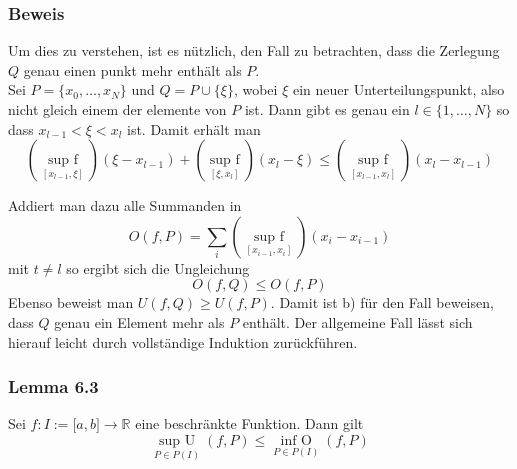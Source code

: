 \subsubsection*{Beweis} 
Um dies zu verstehen, ist es nützlich, den Fall zu betrachten, dass die Zerlegung $Q$ genau einen punkt mehr enthält als $P$.\\

Sei $P=\{x_0,\dots ,x_N\}$ und $Q=P\cup \{\xi\}$, wobei $\xi$ ein neuer Unterteilungspunkt, also nicht gleich einem der elemente von $P$ ist. Dann gibt es genau ein $l\in \{ 1,\dots,N\}$ so dass $x_{l-1}<\xi <x_l$ ist. Damit erhält man $$(\mathop {\sup {\text{ }}f}\limits_{[{x_{l - 1}},\xi ]} )(\xi  - {x_{l - 1}}) + (\mathop {\sup {\text{ }}f}\limits_{[\xi ,{x_l}]} )({x_l} - \xi ) \le (\mathop {\sup {\text{ }}f}\limits_{[{x_{l - 1}},{x_l}]} )({x_l} - {x_{l - 1}})$$


\begin{center}
\end{center}


Addiert man dazu alle Summanden in $$O(f,P)=\sum\limits_i {(\mathop {\sup {\text{ }}f}\limits_{[{x_{i - 1}},{x_i}]} )({x_i} - {x_{i - 1}})} $$
mit $t\neq l$ so ergibt sich die Ungleichung $$O(f,Q)\leq O(f,P)$$
Ebenso beweist man $U(f,Q)\geq U(f,P)$. Damit ist b) für den Fall beweisen, dass $Q$ genau ein Element mehr als $P$ enthält. Der allgemeine Fall lässt sich hierauf leicht durch vollständige Induktion zurückführen. 

\subsubsection*{Lemma 6.3} Sei $f:I:=\lbrack a,b \rbrack \rightarrow \mathbb{R}$ eine beschränkte Funktion. Dann gilt $$\mathop {\sup {\text{ }}U}\limits_{P \in P(I)} (f,P) \le \mathop {\inf {\text{ }}O}\limits_{P \in P(I)} (f,P)$$

